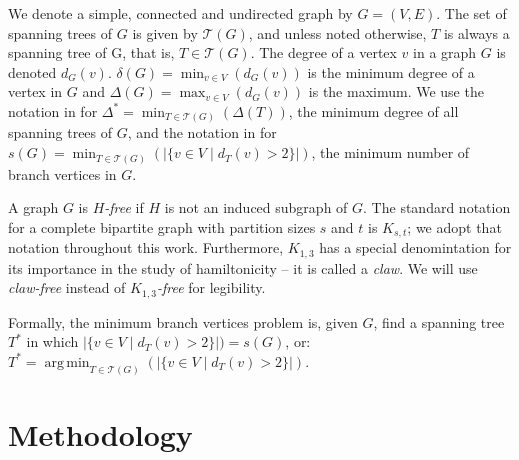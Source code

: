 \documentclass[12pt]{article}
\DeclareMathOperator*{\argmin}{arg\,min}
\begin{document}
We denote a simple, connected and undirected graph by $G = (V, E)$.
The set of spanning trees of $G$ is given by $\mathcal{T}(G)$, and unless noted otherwise, $T$ is always a spanning tree of G, that is, $T \in \mathcal{T}(G)$.
The degree of a vertex $v$ in a graph $G$ is denoted $d_G(v)$.
$\delta(G) = \min_{v \in V}(d_G(v))$ is the minimum degree of a vertex in $G$ and $\Delta(G) = \max_{v \in V}(d_G(v))$ is the maximum.
We use the notation in \cite{furer1992} for $\Delta^* = \min_{T \in \mathcal{T}(G)}(\Delta(T))$, the minimum degree of all spanning trees of $G$, and the notation in \cite{gargano2004} for $s(G) = \min_{T \in \mathcal{T}(G)}(|\{v \in V \mid d_T(v) > 2 \}|)$, the minimum number of branch vertices in $G$.

A graph $G$ is \emph{$H$-free} if $H$ is not an induced subgraph of $G$.
The standard notation for a complete bipartite graph with partition sizes $s$ and $t$ is $K_{s, t}$; we adopt that notation throughout this work.
Furthermore, $K_{1, 3}$ has a special denomintation for its importance in the study of hamiltonicity -- it is called a \emph{claw}.
We will use \emph{claw-free} instead of $K_{1,3}$\emph{-free} for legibility.

Formally, the minimum branch vertices problem is, given $G$, find a spanning tree $T^*$ in which $|\{v \in V \mid d_T(v) > 2 \}|) = s(G)$, or:
$T^* = \argmin_{T \in \mathcal{T}(G)}(|\{ v \in V \mid d_T(v) > 2\}|)$.

\section{Methodology}



\end{document}
